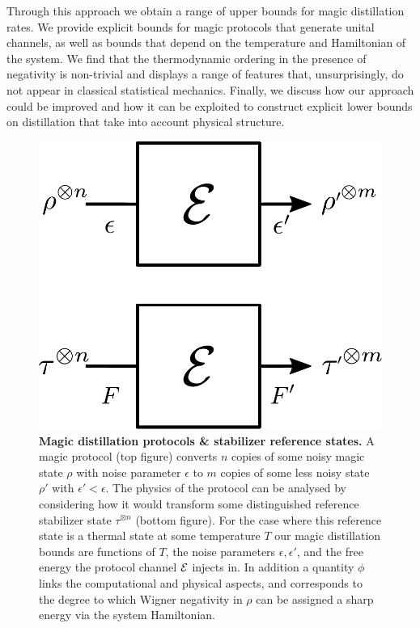 \documentclass[pra,
aps,
twocolumn,
superscriptaddress,
groupedaddress,
nofootinbib,
reprint
]{revtex4-1}
\begin{document}
Through this approach we obtain a range of upper bounds for magic distillation rates. We provide explicit bounds for magic protocols that generate unital channels, as well as bounds that depend on the temperature and Hamiltonian of the system. We find that the thermodynamic ordering in the presence of negativity is non-trivial and displays a range of features that, unsurprisingly, do not appear in classical statistical mechanics. 
Finally, we discuss how our approach could be improved and how it can be exploited to construct explicit lower bounds on distillation that take into account physical structure.

\begin{figure}[t]
    \centering
        \includegraphics[scale=0.3]{figs/protocol_diagram.pdf}
    \caption{\textbf{Magic distillation protocols \& stabilizer reference states.} 
	A magic protocol (top figure) converts $n$ copies of some noisy magic state $\rho$ with noise parameter $\epsilon$ to $m$ copies of some less noisy state $\rho'$ with $\epsilon' < \epsilon$. The physics of the protocol can be analysed by considering how it would transform some distinguished reference stabilizer state $\tau^{\otimes n}$ (bottom figure). For the case where this reference state is a thermal state at some temperature $T$ our magic distillation bounds are functions of $T$, the noise parameters $\epsilon, \epsilon'$, and the free energy the protocol channel ${\mathcal E}$ injects in. In addition a quantity $\phi$ links the computational and physical aspects, and corresponds to the degree to which Wigner negativity in $\rho$ can be assigned a sharp energy via the system Hamiltonian.}
    \label{fig:sketch}
\end{figure}
\end{document}

